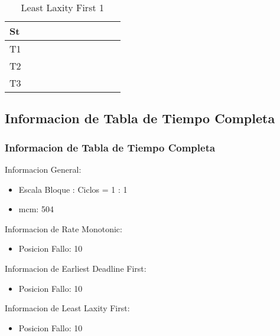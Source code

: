 \documentclass[xcolor=table]{beamer}
\begin{document}
\begin{frame}
\begin{table}
{\begin{tabular}{|l|l|l|l|l|l|l|l|l|l|l|}
St &  \cellcolor{green} &  \cellcolor{green} &  \cellcolor{green} &  \cellcolor{green} &  \cellcolor{green} &  \cellcolor{green} &  \cellcolor{green} &  \cellcolor{green} &  \cellcolor{green} &  \cellcolor{red} \\ \hline 
T1 & & & & & & & \cellcolor{blue} & & \cellcolor{blue} & \\ \hline 
T2 & & & & & & \cellcolor{purple} & & \cellcolor{purple} & & \\ \hline 
T3 & \cellcolor{cyan} & \cellcolor{cyan} & \cellcolor{cyan} & \cellcolor{cyan} & \cellcolor{cyan} & & & & & \cellcolor{cyan} \\ \hline 
\end{tabular} 
} 
\caption{ Least Laxity First 1 } 
\end{table} 
\end{frame} 

\subsection{Informacion de Tabla de Tiempo Completa} 

\begin{frame} 
\frametitle{Informacion de Tabla de Tiempo Completa} 
Informacion General:\\ 
\begin{itemize} 
\item Escala Bloque : Ciclos = 1 : 1 \\ 
\item mcm:  504 \\ 
\end{itemize} 
Informacion de Rate Monotonic:\\ 
\begin{itemize} 
\item Posicion Fallo:  10 \\ 
\end{itemize} 
Informacion de Earliest Deadline First:\\ 
\begin{itemize} 
\item Posicion Fallo:  10 \\ 
\end{itemize} 
Informacion de Least Laxity First:\\ 
\begin{itemize} 
\item Posicion Fallo:  10 \\ 
\end{itemize} 
\end{frame} 

\end{document}
